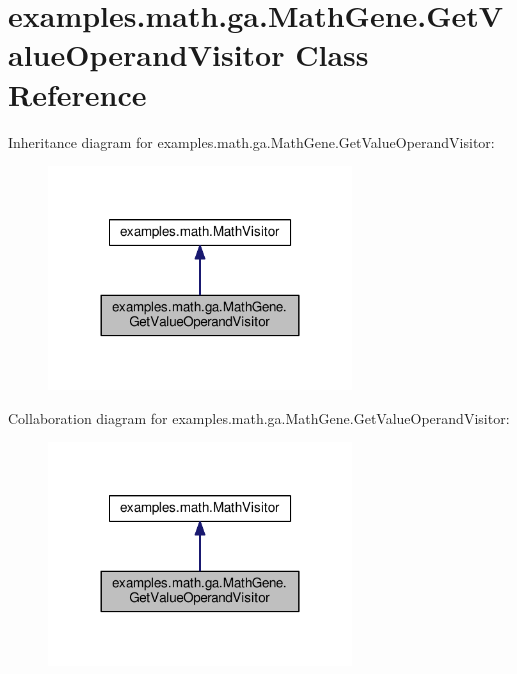 \hypertarget{classexamples_1_1math_1_1ga_1_1_math_gene_1_1_get_value_operand_visitor}{\section{examples.\-math.\-ga.\-Math\-Gene.\-Get\-Value\-Operand\-Visitor Class Reference}
\label{classexamples_1_1math_1_1ga_1_1_math_gene_1_1_get_value_operand_visitor}
}


Inheritance diagram for examples.\-math.\-ga.\-Math\-Gene.\-Get\-Value\-Operand\-Visitor\-:
\nopagebreak
\begin{figure}[H]
\begin{center}
\leavevmode
\includegraphics[width=228pt]{classexamples_1_1math_1_1ga_1_1_math_gene_1_1_get_value_operand_visitor__inherit__graph}
\end{center}
\end{figure}


Collaboration diagram for examples.\-math.\-ga.\-Math\-Gene.\-Get\-Value\-Operand\-Visitor\-:
\nopagebreak
\begin{figure}[H]
\begin{center}
\leavevmode
\includegraphics[width=228pt]{classexamples_1_1math_1_1ga_1_1_math_gene_1_1_get_value_operand_visitor__coll__graph}
\end{center}
\end{figure}
